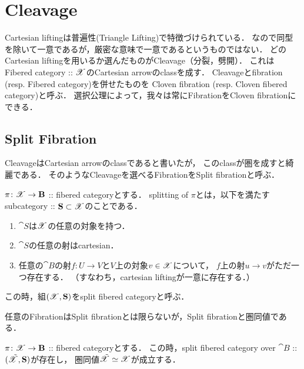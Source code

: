 \documentclass[a4paper, dvipdfmx]{jsarticle}
\begin{document}
\section{Cleavage}
    Cartesian liftingは普遍性(Triangle Lifting)で特徴づけられている．
    なので同型を除いて一意であるが，厳密な意味で一意であるというものではない．
    どのCartesian liftingを用いるか選んだものがCleavage（分裂，劈開）．
    これはFibered category :: $\mathscr{X}$のCartesian arrowのclassを成す．
    Cleavageとfibration (resp. Fibered category)を併せたものを
    Cloven fibration (resp. Cloven fibered category)と呼ぶ．
    選択公理によって，我々は常にFibrationをCloven fibrationにできる．

\subsection{ Split Fibration }
    CleavageはCartesian arrowのclassであると書いたが，
    このclassが圏を成すと綺麗である．
    そのようなCleavageを選べるFibrationをSplit fibrationと呼ぶ．

    \begin{Def}
        $\pi \colon \mathscr{X} \to \mathbf{B}$ :: fibered categoryとする．
        splitting of $\pi$とは，以下を満たすsubcategory :: $\mathbf{S} \subset \mathscr{X}$のことである．
        \begin{enumerate}
            \item
                $\cat{S}$は$\mathscr{X}$の任意の対象を持つ．
            \item
                $\cat{S}$の任意の射はcartesian．
            \item
                任意の$\cat{B}$の射$f \colon U \to V$と$V$上の対象$v \in \mathscr{X}$について，
                $f$上の射$u \to v$がただ一つ存在する．
                （すなわち，cartesian liftingが一意に存在する．）
        \end{enumerate}
        この時，組$(\mathscr{X}, \mathbf{S})$をsplit fibered categoryと呼ぶ．
    \end{Def}

    任意のFibrationはSplit fibrationとは限らないが，Split fibrationと圏同値である．

    \begin{Thm}
        $\pi \colon \mathscr{X} \to \mathbf{B}$ :: fibered categoryとする．
        この時，split fibered category over $\cat{B}$ :: $(\tilde{\mathscr{X}}, \mathbf{S})$が存在し，
        圏同値$\tilde{\mathscr{X}} \overset{{}}{\simeq} \mathscr{X}$が成立する．
    \end{Thm}
\end{document}
